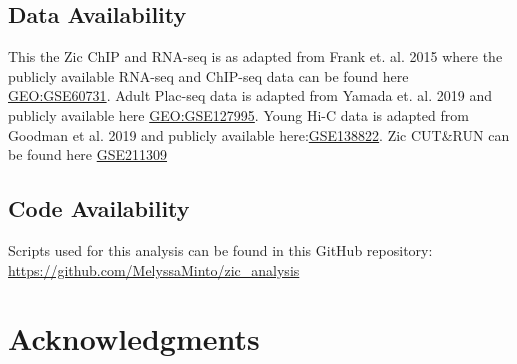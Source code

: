 \documentclass[fleqn,10pt]{wlscirep}
\begin{document}
\subsection*{Data Availability}
This the Zic ChIP and RNA-seq is as adapted from Frank et. al. 2015 \cite{Frank2015RegulationCerebellum} where the publicly available RNA-seq and ChIP-seq  data can be found here \href{https://www.ncbi.nlm.nih.gov/geo/query/acc.cgi?acc=GSE60731}{GEO:GSE60731}. Adult Plac-seq data is adapted from Yamada et. al. 2019 \cite{Yamada2019SensoryLearning} and publicly available here \href{https://www.ncbi.nlm.nih.gov/geo/query/acc.cgi?acc=GSE127995}{GEO:GSE127995}. Young Hi-C data is adapted from Goodman et al. 2019 \cite{Goodman2020TheBrain} and publicly available here:\href{https://www.ncbi.nlm.nih.gov/geo/query/acc.cgi?acc=GSE138822}{GSE138822}. Zic CUT\&RUN can be found here \href{https://www.ncbi.nlm.nih.gov/geo/query/acc.cgi?acc=GSE211309}{GSE211309}

\subsection*{Code Availability}
Scripts used for this analysis can be found in this GitHub repository: \href{https://github.com/MelyssaMinto/zic_analysis}{https://github.com/MelyssaMinto/zic_analysis}

\section*{Acknowledgments}

\clearpage

\clearpage


\beginsupplement
\end{document}
